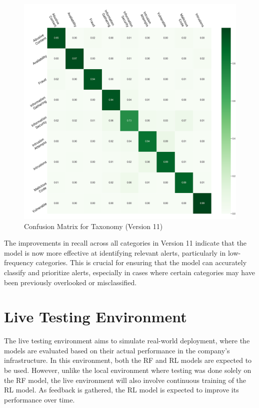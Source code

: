 \begin{figure}[h!]
    \centering
    \includegraphics[width=\textwidth]{ch4/assets/v11_confusion_taxonomy.png}
    \caption{Confusion Matrix for Taxonomy (Version 11)}
    \label{fig:confusion_taxonomy_v11}
\end{figure}

The improvements in recall across all categories in Version 11 indicate that the model is now more effective at identifying relevant alerts, particularly in low-frequency categories.
This is crucial for ensuring that the model can accurately classify and prioritize alerts, especially in cases where certain categories may have been previously overlooked or misclassified.

\section{Live Testing Environment}

The live testing environment aims to simulate real-world deployment, where the models are evaluated based on their actual performance in the company's infrastructure. 
In this environment, both the RF and RL models are expected to be used. 
However, unlike the local environment where testing was done solely on the RF model, the live environment will also involve continuous training of the RL model. 
As feedback is gathered, the RL model is expected to improve its performance over time.

